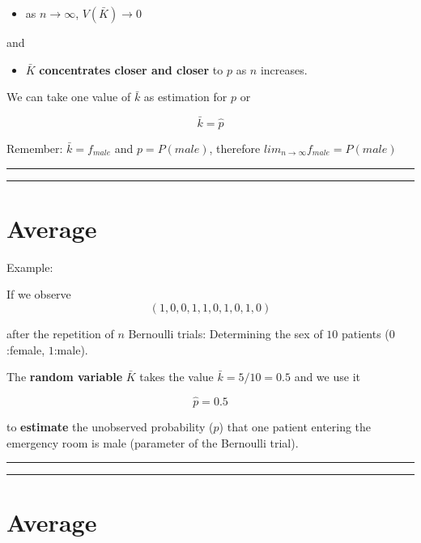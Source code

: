 \documentclass[
]{book}
\providecommand{\tightlist}{%
  \setlength{\itemsep}{0pt}\setlength{\parskip}{0pt}}
\begin{document}
\begin{itemize}
\tightlist
\item
  as \(n \rightarrow \infty\), \(V(\bar{K}) \rightarrow 0\)
\end{itemize}

and

\begin{itemize}
\tightlist
\item
  \(\bar{K}\) \textbf{concentrates closer and closer} to \(p\) as \(n\) increases.
\end{itemize}

We can take one value of \(\bar{k}\) as estimation for \(p\) or

\[\bar{k}=\hat{p}\]

Remember: \(\bar{k}=f_{male}\) and \(p=P(male)\), therefore \(lim_{n\rightarrow \infty} f_{male}=P(male)\)

\begin{center}\rule{0.5\linewidth}{0.5pt}\end{center}

\begin{center}\rule{0.5\linewidth}{0.5pt}\end{center}

\hypertarget{average-3}{%
\section{Average}\label{average-3}}

Example:

If we observe \[(1, 0, 0, 1, 1, 0, 1, 0, 1, 0)\]

after the repetition of \(n\) Bernoulli trials: Determining the sex of \(10\) patients (\(0\):female, \(1\):male).

The \textbf{random variable} \(\bar{K}\) takes the value \(\bar{k}= 5/10=0.5\) and we use it

\[\hat{p}=0.5\]

to \textbf{estimate} the unobserved probability (\(p\)) that one patient entering the emergency room is male (parameter of the Bernoulli trial).

\begin{center}\rule{0.5\linewidth}{0.5pt}\end{center}

\begin{center}\rule{0.5\linewidth}{0.5pt}\end{center}

\hypertarget{average-4}{%
\section{Average}\label{average-4}}
\end{document}
